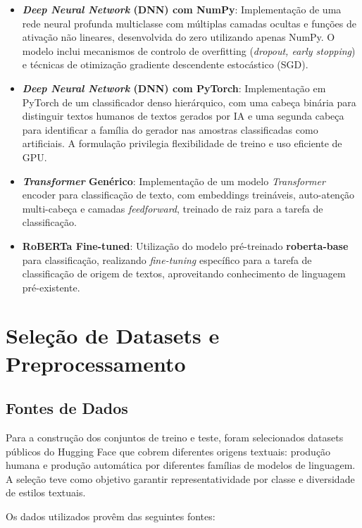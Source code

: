 \documentclass[runningheads]{llncs}
\begin{document}
\begin{itemize}
    \item \textbf{\textit{Deep Neural Network} (DNN) com NumPy}: Implementação de uma rede neural profunda multiclasse com múltiplas camadas ocultas e funções de ativação não lineares, desenvolvida do zero utilizando apenas NumPy. O modelo inclui mecanismos de controlo de overfitting (\textit{dropout, early stopping}) e técnicas de otimização gradiente descendente estocástico (SGD).
    
    \item \textbf{\textit{Deep Neural Network} (DNN) com PyTorch}: Implementação em PyTorch de um classificador denso hierárquico, com uma cabeça binária para distinguir textos humanos de textos gerados por IA e uma segunda cabeça para identificar a família do gerador nas amostras classificadas como artificiais. A formulação privilegia flexibilidade de treino e uso eficiente de GPU.
    
    \item \textbf{\textit{Transformer} Genérico}: Implementação de um modelo \textit{Transformer} encoder para classificação de texto, com embeddings treináveis, auto-atenção multi-cabeça e camadas \textit{feedforward}, treinado de raiz para a tarefa de classificação.
    
    \item \textbf{RoBERTa Fine-tuned}: Utilização do modelo pré-treinado \textbf{roberta-base}~\cite{ref_roberta} para classificação, realizando \textit{fine-tuning} específico para a tarefa de classificação de origem de textos, aproveitando conhecimento de linguagem pré-existente.
\end{itemize}

\section{Seleção de Datasets e Preprocessamento}
\subsection{Fontes de Dados}

Para a construção dos conjuntos de treino e teste, foram selecionados datasets públicos do Hugging Face que cobrem diferentes origens textuais: produção humana e produção automática por diferentes famílias de modelos de linguagem. A seleção teve como objetivo garantir representatividade por classe e diversidade de estilos textuais.

Os dados utilizados provêm das seguintes fontes:
\end{document}
